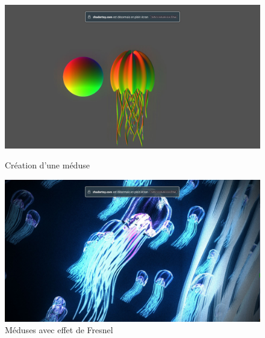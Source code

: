 \begin{figure}[h]
  \begin{minipage}[b]{0.45\linewidth}
    \centering
    \includegraphics[width=\linewidth]{images/shaders/shaderatelier_10.jpg}
    \caption{Création d'une méduse}
    \label{shadat10}
  \end{minipage}
  \hspace{0.1\linewidth} %
  \begin{minipage}[b]{0.45\linewidth}
    \centering
    \includegraphics[width=\linewidth]{images/shaders/shaderatelier_11.jpg}
    \caption{Méduses avec effet de Fresnel}
    \label{shadat11}
  \end{minipage}
\end{figure}

